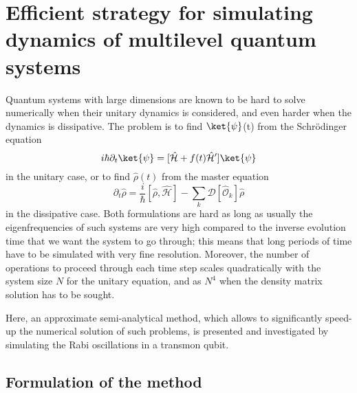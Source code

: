 \chapter{Efficient strategy for simulating dynamics of multilevel quantum systems}

Quantum systems with large dimensions are known to be hard to solve numerically when their unitary dynamics is considered, and even harder when the dynamics is dissipative. The problem is to find ${\ket{\psi}}$(t) from the Schrödinger equation
\begin{equation*}
i\hbar \partial_t {\ket{\psi}} = [\hat{\mathcal{H}} + f(t)\hat{\mathcal{H}}']\ket{\psi}
\end{equation*}
in the unitary case, or to find $\hat \rho(t)$ from the master equation
\[
 \partial_t{\hat \rho} = \frac{i}{\hbar} [\hat\rho, \hat{\mathcal{H}}] - \sum_k \mathcal{D}[\hat{\mathcal{O}}_k]\hat \rho
\]
in the dissipative case. Both formulations are hard as long as usually the eigenfrequencies of such systems are very high compared to the inverse evolution time that we want the system to go through; this means that long periods of time have to be simulated with very fine resolution. Moreover, the number of operations to proceed through each time step scales quadratically with the system size $N$ for the unitary equation, and as $N^4$ when the density matrix solution has to be sought.   

Here, an approximate semi-analytical method, which allows to significantly speed-up the numerical solution of such problems, is presented and investigated by simulating the Rabi oscillations in a transmon qubit.

\section{Formulation of the method}


